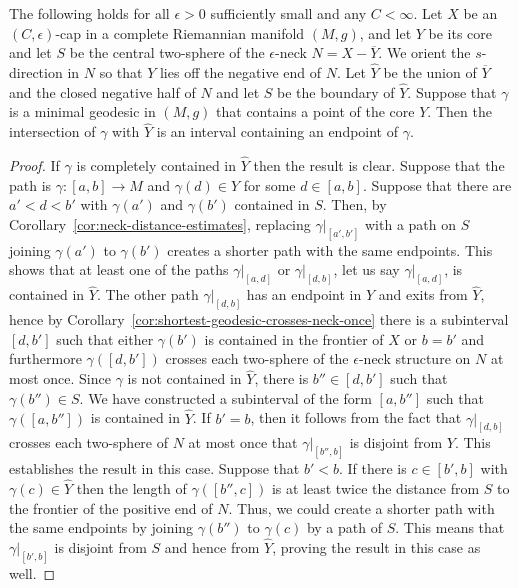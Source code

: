 \begin{corollary}
\label{cor:minimal-geodesic-through-core}
\label{coreint}
The following holds for all $\epsilon>0$ sufficiently small and any
$C<\infty$. Let $X$ be an $(C,\epsilon)$-cap in a complete
Riemannian manifold $(M,g)$, and let $Y$ be its core and let $S$ be
the central two-sphere of the $\epsilon$-neck $N=X-\overline Y$. We
orient the $s$-direction in $N$ so that $Y$ lies off the negative
end of $N$. Let $\widehat Y$ be the union of $\overline Y$ and the
closed negative half of $N$ and let $S$ be the boundary of $\widehat
Y$. Suppose that $\gamma$ is a minimal geodesic in $(M,g)$ that
contains a point of the core $Y$. Then the intersection of $\gamma$
with $\widehat Y$ is an interval containing an endpoint of $\gamma$.
\end{corollary}



\begin{proof}
If $\gamma$ is completely contained in $\widehat Y$ then the result
is clear. Suppose that the path is $\gamma\colon [a,b]\to M$ and
$\gamma(d)\in Y$ for some $d\in [a,b]$. Suppose that there are
$a'<d<b'$ with $\gamma(a')$ and $\gamma(b')$ contained in $S$. Then,
by Corollary~\ref{cor:neck-distance-estimates}, replacing $\gamma|_{[a',b']}$ with a
path on $S$ joining $\gamma(a')$ to $\gamma(b')$ creates a shorter
path with the same endpoints. This shows that at least one of the
paths $\gamma|_{[a,d]}$ or $\gamma|_{[d,b]}$, let us say
$\gamma|_{[a,d]}$, is contained in $\widehat Y$. The other path
$\gamma|_{[d,b]}$ has an endpoint in $Y$ and exits from $\hat Y$,
hence by Corollary~\ref{cor:shortest-geodesic-crosses-neck-once} there is a subinterval $[d,b']$
such that either $\gamma(b')$ is contained in the frontier of $X$ or
$b=b'$ and furthermore $\gamma([d,b'])$ crosses each two-sphere of
the $\epsilon$-neck structure on $N$ at most once. Since $\gamma$ is
not contained in $\hat Y$, there is $b''\in [d,b']$ such that
$\gamma(b'')\in S$. We have constructed a subinterval of the form
$[a,b'']$ such that $\gamma([a,b''])$ is contained in $\widehat Y$.
If $b'=b$, then it follows from the fact that $\gamma|_{[d,b]}$
crosses each two-sphere of $N$ at most once that $\gamma|_{[b'',b]}$
is disjoint from $Y$.  This establishes  the result  in this case.
Suppose that $b'<b$.
 If there is $c\in [b',b]$ with $\gamma(c)\in \widehat
Y$ then the length of $\gamma([b'',c])$ is at least twice the
distance from $S$ to the frontier of the positive end of $N$. Thus,
we could create a shorter path with the same endpoints by joining
$\gamma(b'')$ to $\gamma(c)$ by a path of $S$. This means that
$\gamma|_{[b',b]}$ is disjoint from $S$ and hence from $\widehat Y$,
proving the result in this case as well.
\end{proof}




